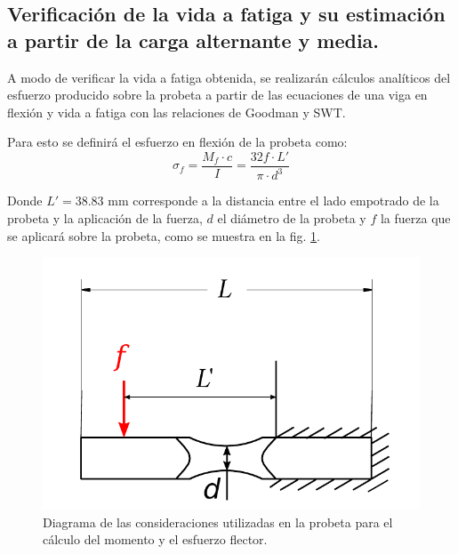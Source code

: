 
\subsection{Verificación de la vida a fatiga y su estimación a partir de la carga alternante y media.}

A modo de verificar la vida a fatiga obtenida, se realizarán cálculos analíticos del esfuerzo producido sobre la probeta a partir de las ecuaciones de una viga en flexión y vida a fatiga con las relaciones de Goodman y SWT.

Para esto se definirá el esfuerzo en flexión de la probeta como:
\begin{equation}
	\sigma_f = \frac{M_f \cdot c}{I} = \frac{32 f\cdot L'}{\pi \cdot d^3}
\end{equation}  

Donde $L' = 38.83$ mm corresponde a la distancia entre el lado empotrado de la probeta y la aplicación de la fuerza, $d$ el diámetro de la probeta y $f$ la fuerza que se aplicará sobre la probeta, como se muestra en la fig. \ref{fig:prob_vf}. 

\begin{figure}[h]
\centering
\includegraphics[width=0.8\linewidth, trim={-2cm -1cm -2cm 0cm}, clip]{Imagenes/probeta_carga.pdf}
\caption{Diagrama de las consideraciones utilizadas en la probeta para el cálculo del momento y el esfuerzo flector.}
\label{fig:prob_vf}
\end{figure}

